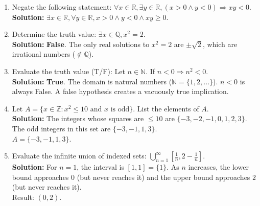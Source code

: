 \documentclass[11pt]{article}
\begin{document}
\begin{enumerate}[label=(\roman*)]
    \item Negate the following statement: $\forall x \in \mathbb{R}, \exists y \in \mathbb{R}, (x>0 \wedge y<0) \Rightarrow xy < 0$.\\
    \textbf{Solution:} $\exists x \in \mathbb{R}, \forall y \in \mathbb{R}, x>0 \wedge y<0 \wedge xy \geq 0$.

    \item Determine the truth value: $\exists x \in \mathbb{Q}, x^2 = 2$.\\
    \textbf{Solution:} \textbf{False}. The only real solutions to $x^2=2$ are $\pm\sqrt{2}$, which are irrational numbers ($\notin \mathbb{Q}$).

    \item Evaluate the truth value (T/F): Let $n \in \mathbb{N}$. If $n < 0 \Rightarrow n^2 < 0$.\\
    \textbf{Solution:} \textbf{True}. The domain is natural numbers ($\mathbb{N} = \{1, 2, ...\}$). $n < 0$ is always False. A false hypothesis creates a vacuously true implication.

    \item Let $A = \{x \in \mathbb{Z} : x^2 \leq 10 \text{ and } x \text{ is odd}\}$. List the elements of $A$.\\
    \textbf{Solution:} The integers whose squares are $\leq 10$ are $\{-3, -2, -1, 0, 1, 2, 3\}$. The odd integers in this set are $\{-3, -1, 1, 3\}$. \\
    $A = \{-3, -1, 1, 3\}$.

    \item Evaluate the infinite union of indexed sets: $\bigcup_{n=1}^\infty \left[\frac{1}{n}, 2-\frac{1}{n}\right]$.\\
    \textbf{Solution:} For $n=1$, the interval is $[1, 1] = \{1\}$. As $n$ increases, the lower bound approaches $0$ (but never reaches it) and the upper bound approaches $2$ (but never reaches it). \\
    Result: $(0, 2)$.
\end{enumerate}
\end{document}
